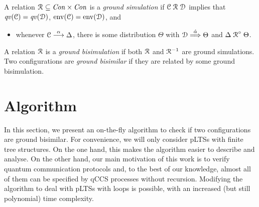 \documentclass[a4paper,UKenglish,cleveref, autoref]{lipics-v2019}
\newcommand{\ptr}{{\rm env}}
\newcommand{\lift}[1]{\mathrel{{#1}^\circ}}
\newcommand{\Con}{{\it Con}}
\newcommand{\qv}{{\it qv}}
\newcommand{\CC}{{\cal C}}
\newcommand{\CD}{{\cal D}}
\begin{document}
\begin{definition}[\cite{DF12}]
	A relation $\aRel\ \subseteq \Con\times\Con$ is a \emph{ground simulation} if
	$\CC\aRel \CD$ implies that $\qv(\CC)=\qv(\CD)$, $\ptr(\CC)=\ptr(\CD)$,
	and
	\begin{itemize}
		\item whenever $\CC\ar{\alpha} \Delta$, there is some distribution $\Theta$ with $\CD\dar{\hat{\alpha}}\Theta$ and $\Delta \lift{\aRel} \Theta$.
	\end{itemize}
	A relation $\mathrel{{\mathcal R }}$ is a \emph{ground bisimulation} if both $\mathrel{{\mathcal R }}$ and
	$\mathrel{{\mathcal R }}^{-1}$ are ground simulations. Two configurations are \emph{ground bisimilar} if they are related by some ground bisimulation.
\end{definition}

\section{Algorithm}
\label{sec:algorithm}
In this section, we present an on-the-fly algorithm to check if two configurations are ground bisimilar.
For convenience, we will only consider pLTSs with finite tree structures. On the one hand, this makes the algorithm easier to describe and analyse. On the other hand, our main motivation of this work is to verify quantum communication protocols and, to the best of our knowledge, almost all of them can be specified by qCCS processes without recursion.
Modifying the algorithm to deal with pLTSs with loops is possible, with an increased (but still polynomial) time complexity.
\end{document}
